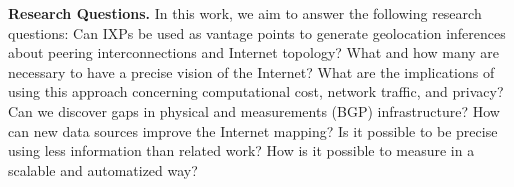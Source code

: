 	\textbf{Research Questions.} In this work, we aim to answer the following research questions: Can IXPs be used as vantage points to generate geolocation inferences about peering interconnections and Internet topology? What and how many are necessary to have a precise vision of the Internet? What are the implications of using this approach concerning computational cost, network traffic, and privacy? Can we discover gaps in physical and measurements (BGP) infrastructure? How can new data sources improve the Internet mapping? Is it possible to be precise using less information than related work? How is it possible to measure in a scalable and automatized way?

